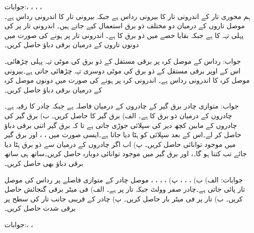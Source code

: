 جوابات:، ، ، ، \\
ہم محوری تار کے اندرونی تار کا بیرونی رداس  ہے جبکہ بیرونی تار کا اندرونی رداس  ہے۔موصل تاروں کے درمیان دو مختلف ذو برق استعمال کیے جاتے ہیں۔ اندرونی تار پر  کی پہلی تہہ کا  ہے جبکہ بقایا حصے میں ذو برق کا  ہے۔ اندرونی تار پر  ہونے کی صورت میں دونوں تاروں کے درمیان برقی دباؤ حاصل کریں۔

جواب:
رداس  کے موصل کرہ پر  برقی مستقل کے ذو برق کی  موٹی تہہ پہلی چڑھائی۔اس کے اوپر  برقی مستقل کے ذو برق کی  موٹی دوسری تہہ چڑھائی جاتی ہے۔بیرونی موصل کرہ کا اندرونی رداس  ہے۔ اندرونی کرہ پر  ہونے کی صورت میں دونوں موصل کرہ کے درمیان برقی دباؤ حاصل کریں۔

جواب:
متوازی چادر برق گیر کے چادروں کے درمیان فاصلہ  ہے جبکہ چادر کا رقبہ  ہے۔چادروں کے درمیان ذو برق کا  ہے۔ الف) برق گیر کا  حاصل کریں۔ ب) برق گیر کی چادروں کے مابین کچھ دیر  کی سپلائی جوڑی جاتی ہے تا کہ برق گیر اتنی  برقی دباؤ حاصل کر لے۔اس کے بعد سپلائی کو ہٹا دیا جاتا ہے۔ایسی صورت میں ، ،  اور برق گیر میں موجود توانائی  حاصل کریں۔ پ) اب اگر چادروں کے درمیان سے ذو برق ہٹا دیا جائے تب  کتنا ہو گا۔،  اور برق گیر میں موجود توانائی  دوبارہ حاصل کریں۔ساتھ ہی ساتھ برقی دباؤ بھی حاصل کریں۔ 

جوابات: الف)  ب) ، ، ،  پ) ، ، ، ، 
موصل چادر کے متوازی  فاصلے پر  رداس کی موصل تار پائی جاتی ہے۔چادر صفر وولٹ جبکہ تار  پر ہے۔ الف) فی میٹر برقی گنجائش حاصل کریں۔ ب) تار پر فی میٹر بار حاصل کریں۔ پ) چادر کے قریبی جانب تار کی سطح پر برقی شدت حاصل کریں۔

جوابات:، ، 


